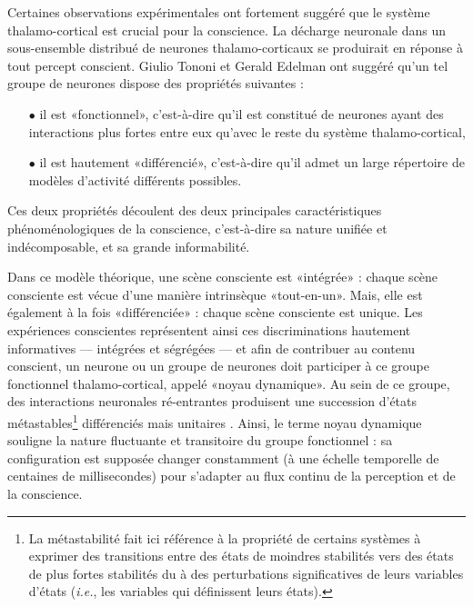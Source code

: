 Certaines observations expérimentales ont fortement suggéré que le système thalamo-cortical est crucial pour la conscience. 
La décharge neuronale dans un sous-ensemble distribué de neurones thalamo-corticaux se produirait en réponse à tout percept conscient. 
Giulio Tononi et Gerald Edelman ont suggéré qu'un tel groupe de neurones dispose des propriétés suivantes \citep{edelman2000reentry, tononi1998consciousness} : 
\begin{itemize}
\item[$\bullet$] il est «fonctionnel», c'est-à-dire qu'il est constitué de neurones ayant des interactions plus fortes entre eux qu'avec le reste du système thalamo-cortical, 
\item[$\bullet$] il est hautement «différencié», c'est-à-dire qu'il admet un large répertoire de modèles d'activité différents possibles. 
\end{itemize}
Ces deux propriétés découlent des deux principales caractéristiques phénoménologiques de la conscience, c'est-à-dire sa nature unifiée et indécomposable, et sa grande informabilité.

Dans ce modèle théorique, une scène consciente est «intégrée» : chaque scène consciente est vécue d'une manière intrinsèque «tout-en-un». 
Mais, elle est également à la fois «différenciée» : chaque scène consciente est unique. 
Les expériences conscientes représentent ainsi ces discriminations hautement informatives --- intégrées et ségrégées --- \citep{edelman2003naturalizing} et afin de contribuer au contenu conscient, un neurone ou un groupe de neurones doit participer à ce groupe fonctionnel thalamo-cortical, appelé «noyau dynamique». 
Au sein de ce groupe, des interactions neuronales ré-entrantes produisent une succession d'états métastables\footnote{La métastabilité fait ici référence à la propriété de certains systèmes à exprimer des transitions entre des états de moindres stabilités vers des états de plus fortes stabilités du à des perturbations significatives de leurs variables d'états (\textit{i.e.}, les variables qui définissent leurs états).} différenciés mais unitaires \citep{edelman2000reentry, edelman2003naturalizing, tononi1998consciousness}. 
Ainsi, le terme noyau dynamique souligne la nature fluctuante et transitoire du groupe fonctionnel : sa configuration est supposée changer constamment (à une échelle temporelle de centaines de millisecondes) pour s'adapter au flux continu de la perception et de la conscience. 

